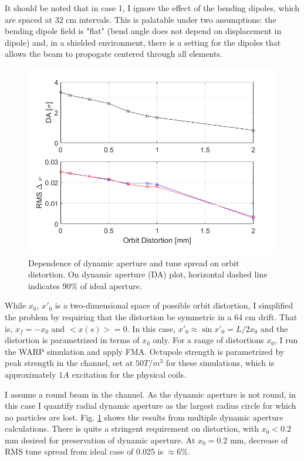 It should be noted that in case 1, I ignore the effect of the bending dipoles, which are spaced at 32 cm intervals. This is palatable under two assumptions: the bending dipole field is "flat" (bend angle does not depend on displacement in dipole) and, in a shielded environment, there is a setting for the dipoles that allows the beam to propogate centered through all elements. 

\begin{figure}
\centering
\includegraphics[width=0.8 \textwidth]{5.figures/steeringtolerance/DA_deltanu_plots_vs_orbit_distortion.png}
\caption{Dependence of dynamic aperture and tune spread on orbit distortion. On dynamic aperture (DA) plot, horizontal dashed line indicates $90\%$ of ideal aperture.}
\label{fig:DAvsorbitdistort}
\end{figure}

While $x_0$, $x'_0$ is a two-dimensional space of possible orbit distortion, I simplified the problem by requiring that the distortion be symmetric in a 64 cm drift. That is, $x_f = -x_0$ and $<x(s)> = 0$. In this case, $x'_0 \approx \sin{x'_0} = L/2x_0$ and the distortion is parametrized in terms of $x_0$ only. For a range of distortions $x_0$, I run the WARP simulation and apply FMA. Octupole strength is parametrized by peak strength in the channel, set at $50 T/m^3$ for these simulations, which is approximately $1 A$ excitation for the physical coils. 
 
I assume a round beam in the channel. As the dynamic aperture is not round, in this case I quantify radial dynamic aperture as the largest radius circle for which no particles are lost. Fig. \ref{fig:DAvsorbitdistort} shows the results from multiple dynamic aperture calculations. There is quite a stringent requirement on distortion, with $x_0 < 0.2$ mm desired for preservation of dynamic aperture. At $x_0 = 0.2$ mm, decrease of RMS tune spread from ideal case of 0.025 is $\approx 6\%$.




